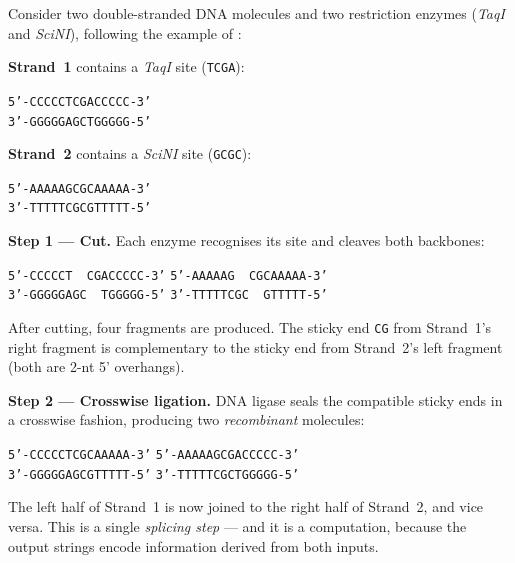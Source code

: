 \begin{example}
Consider two double-stranded DNA molecules and two restriction enzymes (\emph{TaqI} and \emph{SciNI}), following the example of \citet{daleykari2002}:

\textbf{Strand~1} contains a \emph{TaqI} site (\texttt{TCGA}):
\begin{center}
\texttt{5'-CCCCCTCGACCCCC-3'} \\
\texttt{3'-GGGGGAGCTGGGGG-5'}
\end{center}

\textbf{Strand~2} contains a \emph{SciNI} site (\texttt{GCGC}):
\begin{center}
\texttt{5'-AAAAAGCGCAAAAA-3'} \\
\texttt{3'-TTTTTCGCGTTTTT-5'}
\end{center}

\textbf{Step 1 --- Cut.}  Each enzyme recognises its site and cleaves both backbones:
\begin{center}
\texttt{5'-CCCCCT~~CGACCCCC-3'} \quad\quad \texttt{5'-AAAAAG~~CGCAAAAA-3'} \\
\texttt{3'-GGGGGAGC~~TGGGGG-5'} \quad\quad \texttt{3'-TTTTTCGC~~GTTTTT-5'}
\end{center}

After cutting, four fragments are produced.  The sticky end \texttt{CG} from Strand~1's right fragment is complementary to the sticky end from Strand~2's left fragment (both are 2-nt 5' overhangs).

\textbf{Step 2 --- Crosswise ligation.}  DNA ligase seals the compatible sticky ends in a crosswise fashion, producing two \emph{recombinant} molecules:
\begin{center}
\texttt{5'-CCCCCTCGCAAAAA-3'} \quad\quad \texttt{5'-AAAAAGCGACCCCC-3'} \\
\texttt{3'-GGGGGAGCGTTTTT-5'} \quad\quad \texttt{3'-TTTTTCGCTGGGGG-5'}
\end{center}

The left half of Strand~1 is now joined to the right half of Strand~2, and vice versa.  This is a single \emph{splicing step} --- and it is a computation, because the output strings encode information derived from both inputs.
\end{example}


